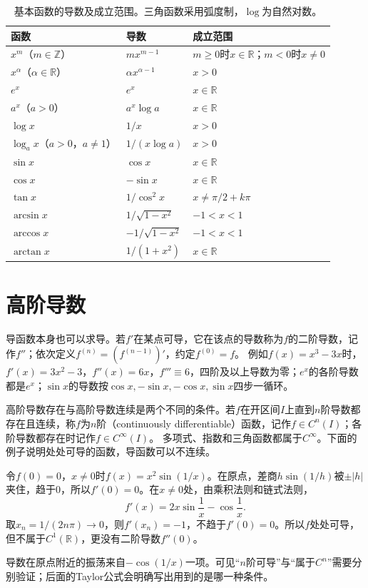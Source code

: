 \begin{table}[htbp]
 \centering\small
 \begin{tabular}{@{}lll@{}}
 \toprule
 函数 & 导数 & 成立范围\\
 \midrule
 $x^m$（$m\in\mathbb Z$） & $mx^{m-1}$ & $m\geq0$时$x\in\mathbb R$；$m<0$时$x\neq0$\\
 $x^\alpha$（$\alpha\in\mathbb R$） & $\alpha x^{\alpha-1}$ & $x>0$\\
 $e^x$ & $e^x$ & $x\in\mathbb R$\\
 $a^x$（$a>0$） & $a^x\log a$ & $x\in\mathbb R$\\
 $\log x$ & $1/x$ & $x>0$\\
 $\log_ax$（$a>0$，$a\neq1$） & $1/(x\log a)$ & $x>0$\\
 $\sin x$ & $\cos x$ & $x\in\mathbb R$\\
 $\cos x$ & $-\sin x$ & $x\in\mathbb R$\\
 $\tan x$ & $1/\cos^2x$ & $x\neq\pi/2+k\pi$\\
 $\arcsin x$ & $1/\sqrt{1-x^2}$ & $-1<x<1$\\
 $\arccos x$ & $-1/\sqrt{1-x^2}$ & $-1<x<1$\\
 $\arctan x$ & $1/(1+x^2)$ & $x\in\mathbb R$\\
 \bottomrule
 \end{tabular}
 \caption{基本函数的导数及成立范围。三角函数采用弧度制，$\log$为自然对数。}
 \label{tab:analysis-elementary-derivatives}
\end{table}
\section{高阶导数}
\label{sec:ru-higher-derivatives}

导函数本身也可以求导。若$f'$在某点可导，它在该点的导数称为$f$的二阶导数，记作$f''$；依次定义$f^{(n)}=(f^{(n-1)})'$，约定$f^{(0)}=f$。
例如$f(x)=x^3-3x$时，$f'(x)=3x^2-3$，$f''(x)=6x$，$f'''\equiv6$，四阶及以上导数为零；$e^x$的各阶导数都是$e^x$；$\sin x$的导数按$\cos x,-\sin x,-\cos x,\sin x$四步一循环。

高阶导数存在与高阶导数连续是两个不同的条件。若$f$在开区间$I$上直到$n$阶导数都存在且连续，称$f$为$n$阶（continuously differentiable）函数，记作$f\in C^n(I)$；各阶导数都存在时记作$f\in C^\infty(I)$。
多项式、指数和三角函数都属于$C^\infty$。下面的例子说明处处可导的函数，导函数可以不连续。
\begin{example}[处处可导而导函数不连续]
\label{ex:analysis-derivative-not-continuous}
令$f(0)=0$，$x\neq0$时$f(x)=x^2\sin(1/x)$。在原点，差商$h\sin(1/h)$被$\pm|h|$夹住，趋于$0$，所以$f'(0)=0$。在$x\neq0$处，由乘积法则和链式法则，
\[
 f'(x)=2x\sin\frac1x-\cos\frac1x.
\]
取$x_n=1/(2n\pi)\to0$，则$f'(x_n)=-1$，不趋于$f'(0)=0$。所以$f$处处可导，但不属于$C^1(\mathbb R)$，更没有二阶导数$f''(0)$。
\end{example}
导数在原点附近的振荡来自$-\cos(1/x)$一项。可见“$n$阶可导”与“属于$C^n$”需要分别验证；后面的Taylor公式会明确写出用到的是哪一种条件。

